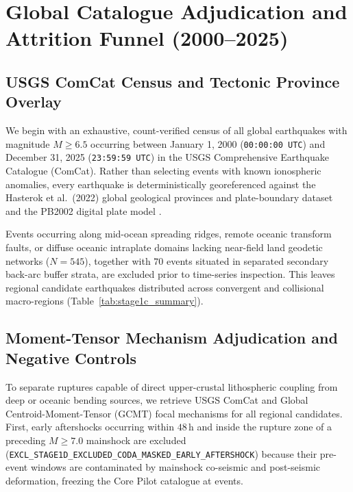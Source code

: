 ﻿\documentclass[journal]{IEEEtran}
\begin{document}
\section{Global Catalogue Adjudication and Attrition Funnel (2000--2025)}

\subsection{USGS ComCat Census and Tectonic Province Overlay}
We begin with an exhaustive, count-verified census of all \LgTotalGlobalEvents{} global earthquakes with magnitude $M \ge 6.5$ occurring between January 1, 2000 (\texttt{00:00:00 UTC}) and December 31, 2025 (\texttt{23:59:59 UTC}) in the USGS Comprehensive Earthquake Catalogue (ComCat). Rather than selecting events with known ionospheric anomalies, every earthquake is deterministically georeferenced against the Hasterok et al.\ (2022) global geological provinces and plate-boundary dataset \cite{hasterok2022} and the PB2002 digital plate model \cite{bird2003}.

Events occurring along mid-ocean spreading ridges, remote oceanic transform faults, or diffuse oceanic intraplate domains lacking near-field land geodetic networks ($N = 545$), together with $70$ events situated in separated secondary back-arc buffer strata, are excluded prior to time-series inspection. This leaves \LgStageOneCRegionalTotal{} regional candidate earthquakes distributed across \LgPilotRegions{} convergent and collisional macro-regions (Table~\ref{tab:stage1c_summary}).



\subsection{Moment-Tensor Mechanism Adjudication and Negative Controls}
To separate ruptures capable of direct upper-crustal lithospheric coupling from deep or oceanic bending sources, we retrieve USGS ComCat and Global Centroid-Moment-Tensor (GCMT) focal mechanisms \cite{ekstrom2012} for all \LgStageOneCRegionalTotal{} regional candidates. First, \LgCodaMaskedExcluded{} early aftershocks occurring within $48\,\text{h}$ and inside the rupture zone of a preceding $M \ge 7.0$ mainshock are excluded (\texttt{EXCL\_STAGE1D\_\allowbreak EXCLUDED\_\allowbreak CODA\_\allowbreak MASKED\_\allowbreak EARLY\_\allowbreak AFTERSHOCK}) because their pre-event windows are contaminated by mainshock co-seismic and post-seismic deformation, freezing the Core Pilot catalogue at \LgCorePilotIncluded{} events.
\end{document}
